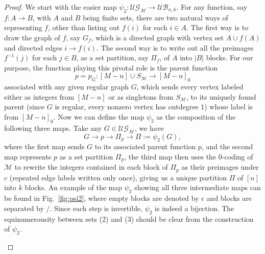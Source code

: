 \documentclass[11pt,reqno]{amsart}
\numberwithin{equation}{section}
\theoremstyle{plain}
\theoremstyle{definition}
\newcommand{\M}{\mathcal{M}}
\newcommand{\UB}{\mathcal{UB}}
\newcommand{\UG}{\mathcal{UG}}
\begin{document}
\begin{proof}
We start with the easier map $\psi_2:\UG_{\M}\rightarrow \UB_{n,k}$. For any function, say $f:A\rightarrow B$, with $A$ and $B$ being finite sets, there are two natural ways of representing $f$, other than listing out $f(i)$ for each $i\in A$. The first way is to draw the graph of $f$, say $G_f$, which is a directed graph with vertex set $A\cup f(A)$ and directed edges $i\rightarrow f(i)$. The second way is to write out all the preimages $f^{-1}(j)$ for each $j\in B$, as a set partition, say $\Pi_f$, of $A$ into $|B|$ blocks. For our purpose, the function playing this pivotal role is the parent function $$p=p_G:[M-n]\cup S_{\M}\rightarrow [M-n]_0$$ associated with any given regular graph $G$, which sends every vertex labeled either as integers from $[M-n]$ or as singletons from $S_{\M}$, to its uniquely found parent (since $G$ is regular, every nonzero vertex has outdegree $1$) whose label is from $[M-n]_0$. Now we can define the map $\psi_2$ as the composition of the following three maps. Take any $G\in\UG_{\M}$, we have
$$G\rightarrow p\rightarrow \Pi_p\rightarrow \Pi:=\psi_2(G),$$
where the first map sends $G$ to its associated parent function $p$, and the second map represents $p$ as a set partition $\Pi_p$, the third map then uses the $0$-coding of $\M$ to rewrite the integers contained in each block of $\Pi_p$ as their preimages under $c$ (repeated edge labels written only once), giving us a unique partition $\Pi$ of $[n]$ into $k$ blocks. An example of the map $\psi_2$ showing all three intermediate maps can be found in Fig.~\ref{fig:psi2}, where empty blocks are denoted by $\epsilon$ and blocks are separated by $\slash$. Since each step is invertible, $\psi_2$ is indeed a bijection. The equinumerousity between sets (2) and (3) should be clear from the construction of $\psi_2$.

\begin{figure}[htb]
\end{figure}
\end{proof}
\end{document}
